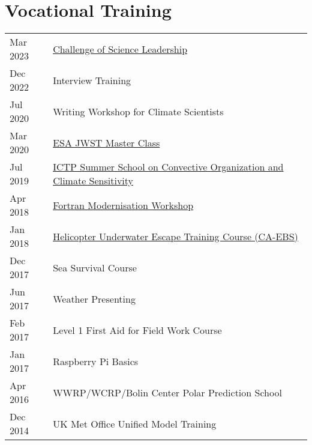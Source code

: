 \documentclass[a4paper, 11pt]{article}
\begin{document}
\section{Vocational Training}
\begin{tabularx}{\linewidth}{@{}l X@{}}
Mar 2023 & \href{http://www.scienceleadership.co.uk}{Challenge of Science Leadership} \\
Dec 2022 & Interview Training \\
Jul 2020 & Writing Workshop for Climate Scientists \\
Mar 2020 & \href{https://ers-imaging.github.io/uk_workshop}{ESA JWST Master Class} \\
Jul 2019 & \href{https://indico.ictp.it/event/8669}{ICTP Summer School on Convective Organization and Climate Sensitivity} \\
Apr 2018 & \href{https://www.nag.com/content/fortran-modernization-workshop}{Fortran Modernisation Workshop} \\
Jan 2018 & \href{http://www.petans.co.uk/courses/survival/huet-caebs/}{Helicopter Underwater Escape Training Course (CA-EBS)} \\
Dec 2017 & Sea Survival Course \\
Jun 2017 & Weather Presenting \\
Feb 2017 & Level 1 First Aid for Field Work Course \\
Jan 2017 & Raspberry Pi Basics \\
Apr 2016 & WWRP/WCRP/Bolin Center Polar Prediction School \\
Dec 2014 & UK Met Office Unified Model Training \\
\end{tabularx}
\end{document}
